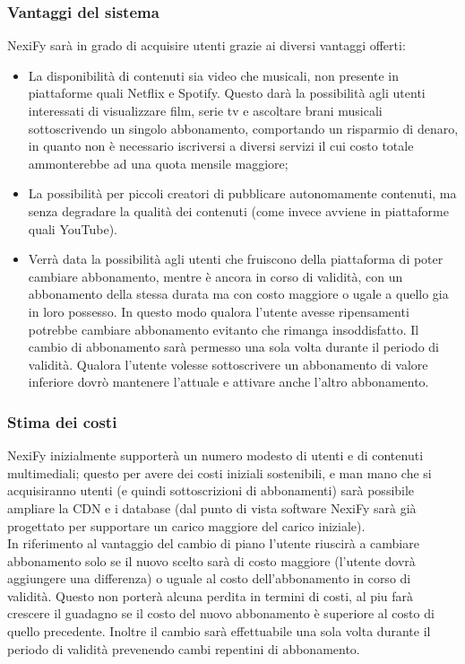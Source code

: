 \subsubsection{Vantaggi del sistema}

NexiFy sarà in grado di acquisire utenti grazie ai diversi vantaggi offerti:
    \begin{itemize}
       	\item La disponibilità di contenuti sia video che musicali, non presente in piattaforme quali Netflix e Spotify. Questo darà la possibilità agli utenti interessati di visualizzare film, serie tv e ascoltare brani musicali sottoscrivendo un singolo abbonamento, comportando un risparmio di denaro, in quanto non è necessario iscriversi a diversi servizi il cui costo totale ammonterebbe ad una quota mensile maggiore;
        	\item La possibilità per piccoli creatori di pubblicare autonomamente contenuti, ma senza degradare la qualità dei contenuti (come invece avviene in piattaforme quali YouTube).
	\item\label{VantaggioSistema_cambioPiano} Verrà data la possibilità agli utenti che fruiscono della piattaforma di poter cambiare abbonamento, mentre è ancora in corso di validità, con un abbonamento della stessa durata ma con costo maggiore o ugale a quello gia in loro possesso. In questo modo qualora l'utente avesse ripensamenti potrebbe cambiare abbonamento evitanto che rimanga insoddisfatto. Il cambio di abbonamento sarà permesso una sola volta durante il periodo di validità. Qualora l'utente volesse sottoscrivere un abbonamento di valore inferiore dovrò mantenere l'attuale e attivare anche l'altro abbonamento.
	\end{itemize}
\subsubsection{Stima dei costi}

NexiFy inizialmente supporterà un numero modesto di utenti e di contenuti multimediali; questo per avere dei costi iniziali sostenibili, e man mano che si acquisiranno utenti (e quindi sottoscrizioni di abbonamenti) sarà possibile ampliare la CDN e i database (dal punto di vista software NexiFy sarà già progettato per supportare un carico maggiore del carico iniziale).\\
In riferimento al vantaggio del cambio di piano l'utente riuscirà a cambiare abbonamento solo se il nuovo scelto sarà di costo maggiore (l'utente dovrà aggiungere una differenza) o uguale al costo dell'abbonamento in corso di validità. Questo non porterà alcuna perdita in termini di costi, al piu farà crescere il guadagno se il costo del nuovo abbonamento è superiore al costo di quello precedente. Inoltre il cambio sarà effettuabile una sola volta durante il periodo di validità prevenendo cambi repentini di abbonamento.

